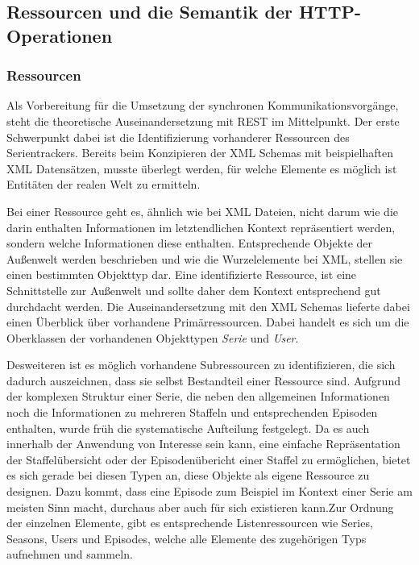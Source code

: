 \newpage

\subsection{Ressourcen und die Semantik der HTTP-Operationen}
\subsubsection{Ressourcen}

Als Vorbereitung für die Umsetzung der synchronen Kommunikationsvorgänge, steht die theoretische Auseinandersetzung mit REST im Mittelpunkt.
Der erste Schwerpunkt dabei ist die Identifizierung vorhanderer Ressourcen des Serientrackers. Bereits beim Konzipieren der XML Schemas mit beispielhaften XML Datensätzen, musste überlegt werden, für welche Elemente es möglich ist Entitäten der realen Welt zu ermitteln.

Bei einer Ressource geht es, ähnlich wie bei XML Dateien, nicht darum wie die darin enthalten Informationen im letztendlichen Kontext repräsentiert werden, sondern welche Informationen diese enthalten. Entsprechende Objekte der Außenwelt werden beschrieben und wie die Wurzelelemente bei XML, stellen sie einen bestimmten Objekttyp dar. Eine identifizierte Ressource, ist eine Schnittstelle zur Außenwelt und sollte daher dem Kontext entsprechend gut durchdacht werden.
Die Auseinandersetzung mit den XML Schemas lieferte dabei einen Überblick über vorhandene Primärressourcen. Dabei handelt es sich um die Oberklassen der vorhandenen Objekttypen \textit{Serie} und \textit{User}.

Desweiteren ist es möglich vorhandene Subressourcen zu identifizieren, die sich dadurch auszeichnen, dass sie selbst Bestandteil einer Ressource sind.
Aufgrund der komplexen Struktur einer Serie, die neben den allgemeinen Informationen noch die Informationen zu mehreren Staffeln und entsprechenden Episoden enthalten, wurde früh die systematische Aufteilung festgelegt.
Da es auch innerhalb der Anwendung von Interesse sein kann, eine einfache Repräsentation der Staffelübersicht oder der Episodenübericht einer Staffel zu ermöglichen, bietet es sich gerade bei diesen Typen an, diese Objekte als eigene Ressource zu designen. Dazu kommt, dass eine Episode zum Beispiel im Kontext einer Serie am meisten Sinn macht, durchaus aber auch für sich existieren kann.Zur Ordnung der einzelnen Elemente, gibt es entsprechende Listenressourcen wie Series, Seasons, Users und Episodes, welche alle Elemente des zugehörigen Typs aufnehmen und sammeln.\\

